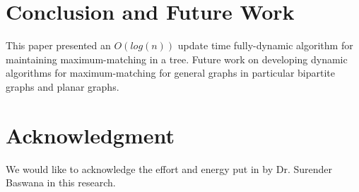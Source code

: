 \documentclass[a4paper,12pt]{article}
\begin{document}
\section{Conclusion and Future Work}
This paper presented an $O(log(n))$ update time fully-dynamic algorithm for maintaining maximum-matching in a tree. 
Future work on developing dynamic algorithms for maximum-matching for general graphs in particular bipartite graphs and planar graphs.

\section{Acknowledgment}
We would like to acknowledge the effort and energy put in by Dr. Surender Baswana in this research.


\end{document}
